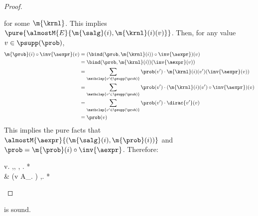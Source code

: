 \begin{proof}
\begin{casesplit}
for some $\m{\krnl}$.
    This implies
    $\pure{\almostM{E}{\m{\salg}(i), \m{\krnl}(i)(v)}}$.
    Then, for any value $v \in \psupp(\prob)$,
    \begin{align*}
      \m{\prob}(i) \circ \inv{\aexpr}(v)
      &=(\bind(\prob, \m{\krnl}(i) ) \circ \inv{\aexpr})(v)\\
      &=  \bind(\prob, \m{\krnl}(i) )  (\inv{\aexpr}(v)) \\
      &=  \sum_{\mathclap{v'\in\psupp(\prob)}}  \prob(v') \cdot \m{\krnl}(i)(v') (\inv{\aexpr}(v)) \\
      &=  \sum_{\mathclap{v'\in\psupp(\prob)}}  \prob(v') \cdot (\m{\krnl}(i)(v') \circ \inv{\aexpr}) (v) \\
      &=  \sum_{\mathclap{v'\in\psupp(\prob)}}  \prob(v') \cdot \dirac{v'} (v) \\
&=  \prob(v)
    \end{align*}
    This implies the pure facts that
    $ \almostM{\aexpr}{(\m{\salg}(i),\m{\prob}(i))}$ and
    $\prob = \m{\prob}(i) \circ \inv{\aexpr}$.
    Therefore:
    \begin{eqexplain}
      \CC\prob v.  \notag
      \whichproves*
      \E \m{\salg},\m{\prob}, \m{\krnl}, \m{\permap}.
          \Own{\m{\salg},\m{\prob}, \m{\permap}} *
           \notag \\
          & \qquad \qquad  *
          (\forall v \in A_{\prob}.
          \wand
          )
      \whichproves
      \E \m{\salg},\m{\prob}.
        \Own{\m{\salg},\m{\prob}} *
            \ast
       \whichproves
       \qedhere
    \end{eqexplain}
  \end{casesplit}
\end{proof}
 \begin{lemma}
\label{proof:c-assoc}
   is sound.
\end{lemma}


